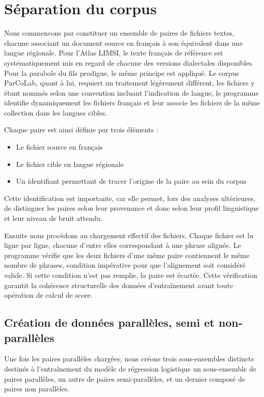 \section{Séparation du corpus}

Nous commencons par constituer un ensemble de paires de fichiers textes, 
chacune associant un document source en français à son équivalent dans une langue régionale. 
Pour l'Atlas LIMSI, le texte français de référence est systématiquement mis en regard de chacune des versions
dialectales disponibles. Pour la parabole du fils prodigue, le même principe est appliqué. Le corpus ParCoLab,
quant à lui, requiert un
traitement légèrement différent, les fichiers y étant nommés selon une convention incluant l'indication
de langue, le programme identifie dynamiquement les fichiers français et leur associe les fichiers de la
même collection dans les langues cibles.

Chaque paire est ainsi définie par trois éléments{ :} 
\begin{itemize}
    \item Le fichier source en français
    \item Le fichier cible en langue régionale
    \item Un identifiant permettant de tracer l'origine de la paire au sein du corpus
\end{itemize}
Cette identification est importante, car elle permet, lors des analyses ultérieures, de distinguer les paires
selon leur provenance et donc selon leur profil linguistique et leur niveau de bruit attendu.

Ensuite nous procèdons au chargement effectif des fichiers. Chaque fichier est 
lu ligne par ligne, chacune d'entre elles correspondant à une phrase alignée. Le programme vérifie que les deux 
fichiers d'une même paire contiennent le même nombre de phrases, condition impérative pour que l'alignement 
soit considéré valide. Si cette condition n'est pas remplie, la paire est écartée. Cette vérification garantit
la cohérence structurelle des données d'entraînement avant toute opération de calcul de score.

\subsection{Création de données parallèles, semi et non-parallèles}

Une fois les paires parallèles chargées, nous créons trois sous-ensembles 
distincts destinés à l'entraînement du modèle de régression logistique un sous-ensemble de paires 
parallèles, un autre de paires semi-parallèles, et un dernier composé de paires non parallèles.


